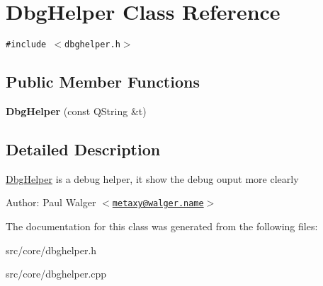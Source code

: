 \hypertarget{classDbgHelper}{
\section{DbgHelper Class Reference}
\label{classDbgHelper}
}
{\tt \#include $<$dbghelper.h$>$}

\subsection*{Public Member Functions}
\begin{CompactItemize}
\item 
\hypertarget{classDbgHelper_d592120d919e04305d93c0aff04fd85f}{
\textbf{DbgHelper} (const QString \&t)}
\label{classDbgHelper_d592120d919e04305d93c0aff04fd85f}

\end{CompactItemize}


\subsection{Detailed Description}
\hyperlink{classDbgHelper}{DbgHelper} is a debug helper, it show the debug ouput more clearly

\begin{Desc}
\item[Author:]Paul Walger $<$\href{mailto:metaxy@walger.name}{\tt metaxy@walger.name}$>$ \end{Desc}


The documentation for this class was generated from the following files:\begin{CompactItemize}
\item 
src/core/dbghelper.h\item 
src/core/dbghelper.cpp\end{CompactItemize}
